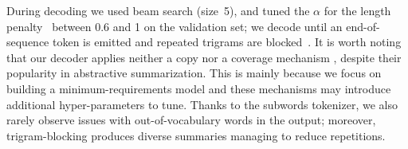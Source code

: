 \documentclass[11pt,a4paper]{article}
\begin{document}
    During decoding we used beam search (size~5), and tuned the
    $\alpha$ for the length penalty~\citep{wu2016google} between $0.6$
    and 1 on the validation set; we decode until an end-of-sequence
    token is emitted and repeated trigrams are
    blocked~\cite{paulus2017deep}.  It is worth noting that our
    decoder applies neither a copy nor a coverage mechanism
    \cite{see-acl17}, despite their popularity in abstractive
    summarization. This is mainly because we focus on building a
    minimum-requirements model and these mechanisms may introduce
    additional hyper-parameters to tune.  Thanks to the subwords
    tokenizer, we also rarely observe issues with out-of-vocabulary
    words in the output; moreover, trigram-blocking produces diverse
    summaries managing to reduce repetitions. 
    
    
    
    
    
\end{document}
